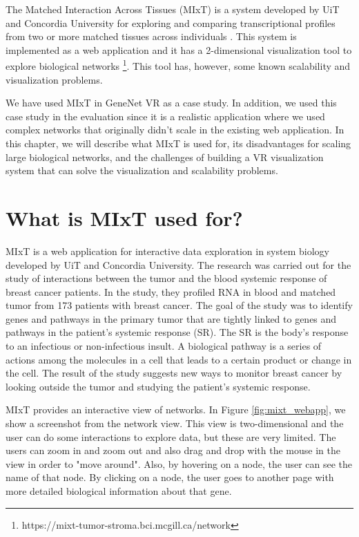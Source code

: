 
The Matched Interaction Across Tissues (MIxT) is a system developed by UiT and Concordia University for exploring and comparing transcriptional profiles from two or more matched tissues across individuals \cite{fjukstad_dumeaux_olsen_lund_hallett_bongo_2017}. This system is implemented as a web application and it has a 2-dimensional visualization tool to explore biological networks \footnote{https://mixt-tumor-stroma.bci.mcgill.ca/network}. This tool has, however, some known scalability and visualization problems.

We have used MIxT in GeneNet VR as a case study. In addition, we used this case study in the evaluation since it is a realistic application where we used complex networks that originally didn't scale in the existing web application. In this chapter, we will describe what MIxT is used for, its disadvantages for scaling large biological networks, and the challenges of building a VR visualization system that can solve the visualization and scalability problems.

\section{What is MIxT used for?}
MIxT is a web application for interactive data exploration in system biology developed by UiT and Concordia University. The research was carried out for the study of interactions between the tumor and the blood systemic response of breast cancer patients. In the study, they profiled RNA in blood and matched tumor from 173 patients with breast cancer. The goal of the study was to identify genes and pathways in the primary tumor that are tightly linked to genes and pathways in the patient's systemic response (SR). The SR is the body's response to an infectious or non-infectious insult. A biological pathway is a series of actions among the molecules in a cell that leads to a certain product or change in the cell. The result of the study suggests new ways to monitor breast cancer by looking outside the tumor and studying the patient's systemic response.

MIxT provides an interactive view of networks. In Figure \ref{fig:mixt_webapp}, we show a screenshot from the network view. This view is two-dimensional and the user can do some interactions to explore data, but these are very limited. The users can zoom in and zoom out and also drag and drop with the mouse in the view in order to "move around". Also, by hovering on a node, the user can see the name of that node. By clicking on a node, the user goes to another page with more detailed biological information about that gene.

